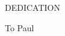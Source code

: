 \newpage


\begin{center}
DEDICATION
\end{center}


\begin{center}
\vspace{4cm}
To Paul
\end{center}
